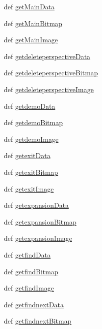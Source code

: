 \begin{DoxyCompactItemize}
\item 
def \hyperlink{namespaceimages_abb6f8c57ef114aa26e09f052de32ee37}{getMainData}
\item 
def \hyperlink{namespaceimages_a27714775d4cb6eac3bd7e159d6e46c63}{getMainBitmap}
\item 
def \hyperlink{namespaceimages_ab862b8d66043f81925599a7ebdd574e4}{getMainImage}
\item 
def \hyperlink{namespaceimages_a84210c8f60dfc02454746435fc644ae4}{getdeleteperspectiveData}
\item 
def \hyperlink{namespaceimages_a89d3e7bf7417546fa0f6e087fa84dd5b}{getdeleteperspectiveBitmap}
\item 
def \hyperlink{namespaceimages_a758b0b47eaa31d0245709d0603ca2004}{getdeleteperspectiveImage}
\item 
def \hyperlink{namespaceimages_a12720cd83f262a032eb623c3e8556b8c}{getdemoData}
\item 
def \hyperlink{namespaceimages_a316cd98fffddcd3793a6378a6a3337ea}{getdemoBitmap}
\item 
def \hyperlink{namespaceimages_a233a1fd0bfe85a8ea8ab40b42d9c43fa}{getdemoImage}
\item 
def \hyperlink{namespaceimages_a1c7813c8e581d3d6842911ddf0fe5105}{getexitData}
\item 
def \hyperlink{namespaceimages_ac88a5f50f76c021143a8a756390068ac}{getexitBitmap}
\item 
def \hyperlink{namespaceimages_a6a5739bb3d5b25048b2359434a0d108b}{getexitImage}
\item 
def \hyperlink{namespaceimages_aaa661f7474d24c9503cf37c5087026c4}{getexpansionData}
\item 
def \hyperlink{namespaceimages_a6a95ffa0745f5048d41fad05294a47d4}{getexpansionBitmap}
\item 
def \hyperlink{namespaceimages_aa793d184a850e1d942b19425f9151dce}{getexpansionImage}
\item 
def \hyperlink{namespaceimages_a0a168003e10f90a3e3d4b2a21168e700}{getfindData}
\item 
def \hyperlink{namespaceimages_ac63043f1f2ef99caf8662784d88b109e}{getfindBitmap}
\item 
def \hyperlink{namespaceimages_a59d884454b5b132ffb57be4679d372e1}{getfindImage}
\item 
def \hyperlink{namespaceimages_af9d92d0740834dd93d20d8a820fa7a5d}{getfindnextData}
\item 
def \hyperlink{namespaceimages_a5afd28cc8f7e2cfb06296d5f2018e511}{getfindnextBitmap}

\end{DoxyCompactItemize}
